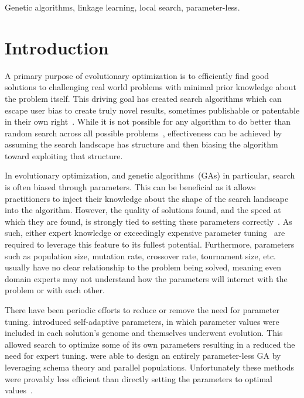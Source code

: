 \documentclass[twoside]{article}
\begin{document}
\begin{keywords}

Genetic algorithms, 
linkage learning,
local search,
parameter-less.

\end{keywords}

\section{Introduction}
A primary purpose of evolutionary optimization is to efficiently find good solutions
to challenging real world problems with minimal prior knowledge about the problem itself.
This driving goal has created search algorithms which can escape user bias to create
truly novel results, sometimes publishable or patentable in their own right~\citep{kannappan:2014:humies}.
While it is not possible for any algorithm to do better than random search across all possible
problems~\citep{Wolpert:1997:nfl}, effectiveness can be achieved by assuming the search
landscape has structure and then biasing the algorithm toward exploiting that structure.

In evolutionary optimization, and genetic algorithms~(GAs) in particular, search is often
biased through parameters. This can be beneficial as it allows practitioners to inject their
knowledge about the shape of the search landscape into the algorithm.
However, the quality of solutions found, and the speed at which they are found, is strongly tied to setting these parameters
correctly~\citep{goldberg:1991:gasize}. As such, either expert knowledge or exceedingly
expensive parameter tuning~\citep{grefenstette:1986:optimalga} are required to leverage
this feature to its fullest potential. Furthermore,  parameters such as population size, mutation rate, crossover
rate, tournament size, etc. usually have no clear relationship to the problem being solved, meaning even
domain experts may not understand how the parameters will interact with the problem or with each other.

There have been periodic efforts to reduce or remove the need for parameter tuning.
\cite{Back:1992:selfadapt} introduced self-adaptive parameters, in which parameter values
were included in each solution's genome and themselves underwent evolution. This allowed search
to optimize some of its own parameters resulting in a reduced the need for expert tuning.
\cite{harik:1999:parameterlessga} were able to design an entirely parameter-less GA by
leveraging schema theory and parallel populations. Unfortunately these methods were provably less efficient
than directly setting the parameters to optimal values~\citep{pelikan:1999:worstparameter-less}.
\end{document}
